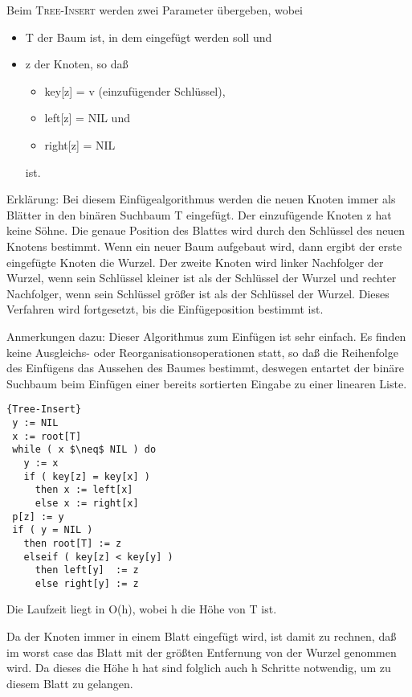   	\begin{description}
			\item{Beim \textsc{Tree-Insert} werden zwei Parameter übergeben, wobei}
			\begin{itemize}
				\item T der Baum ist, in dem eingefügt werden soll und
		 		\item z der Knoten, so daß	
		 		\begin{itemize}
					\item key[z]   = v (einzufügender Schlüssel),
					\item left[z]  = NIL und
					\item right[z] = NIL
				\end{itemize}
				ist.
			\end{itemize}
		\end{description}
 	Erklärung:
	Bei diesem Einfügealgorithmus werden die neuen Knoten immer als 
	Blätter in den binären Suchbaum T eingefügt. Der einzufügende 
	Knoten z hat keine Söhne. Die genaue Position des Blattes wird 
	durch den Schlüssel des neuen Knotens bestimmt. Wenn ein neuer 
	Baum aufgebaut wird, dann ergibt der erste eingefügte Knoten die 
	Wurzel. Der zweite Knoten wird linker Nachfolger der Wurzel, wenn 
	sein Schlüssel kleiner ist als der Schlüssel der Wurzel und rechter 
	Nachfolger, wenn sein Schlüssel größer ist als der Schlüssel der 
	Wurzel. Dieses Verfahren wird fortgesetzt, bis die Einfügeposition bestimmt ist.

	Anmerkungen dazu:
	Dieser Algorithmus zum Einfügen ist sehr einfach. Es finden keine 
	Ausgleichs- oder Reorganisationsoperationen statt, so daß die 
	Reihenfolge des Einfügens das Aussehen des Baumes bestimmt, deswegen 
	entartet der binäre Suchbaum beim Einfügen einer bereits sortierten Eingabe
	zu einer linearen Liste. 

\begin{Algorithmus}
\begin{lstlisting}[frame=tlrb, mathescape=true, title=\textsc{Tree-Insert}, gobble=1]{Tree-Insert}
 y := NIL
 x := root[T]
 while ( x $\neq$ NIL ) do
   y := x
   if ( key[z] = key[x] ) 
     then x := left[x]
     else x := right[x]
 p[z] := y
 if ( y = NIL )
   then root[T] := z
   elseif ( key[z] < key[y] )
     then left[y]  := z
     else right[y] := z    
	    \end{lstlisting}

Die Laufzeit liegt in O(h), wobei h die Höhe von T ist.
\end{Algorithmus}    
    Da der Knoten immer in einem Blatt eingefügt wird, ist damit zu rechnen,
    daß im worst case das Blatt mit der größten Entfernung von der Wurzel
    genommen wird. Da dieses die Höhe h hat sind folglich auch h Schritte
    notwendig, um zu diesem Blatt zu gelangen.
        
